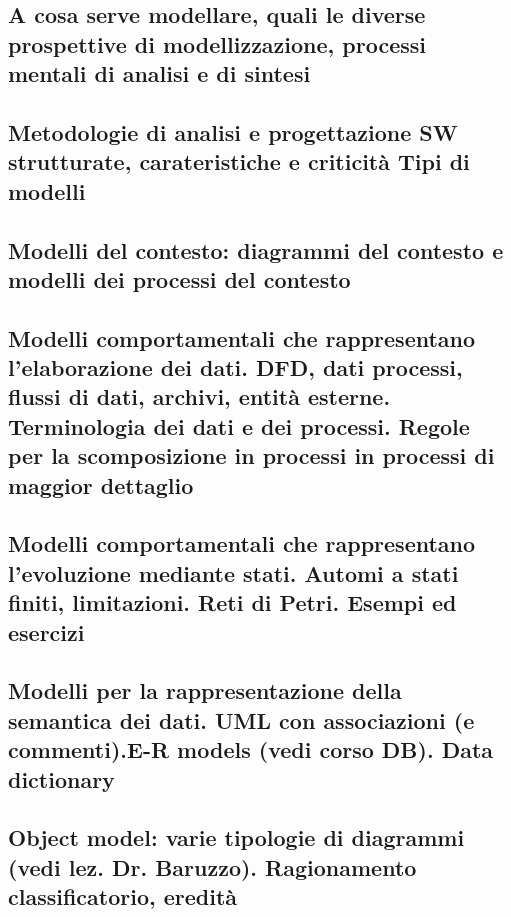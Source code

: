 \subsection{A cosa serve modellare, quali le diverse prospettive di modellizzazione, processi mentali di analisi e di sintesi}
\subsection{Metodologie di analisi e progettazione SW strutturate, carateristiche e criticità
Tipi di modelli}
\subsection{Modelli del contesto: diagrammi del contesto e modelli dei processi del contesto}
\subsection{Modelli comportamentali che rappresentano l’elaborazione dei dati. DFD, dati processi, flussi di dati, archivi, entità esterne. Terminologia dei dati e dei processi. Regole per la scomposizione in processi in processi di maggior dettaglio}
\subsection{Modelli comportamentali che rappresentano l’evoluzione mediante stati. Automi a stati finiti, limitazioni. Reti di Petri. Esempi ed esercizi}
\subsection{Modelli per la rappresentazione della semantica dei dati. UML con associazioni (e commenti).E-R models (vedi corso DB). Data dictionary}
\subsection{Object model: varie tipologie di diagrammi (vedi lez. Dr. Baruzzo). Ragionamento classificatorio, eredità}

